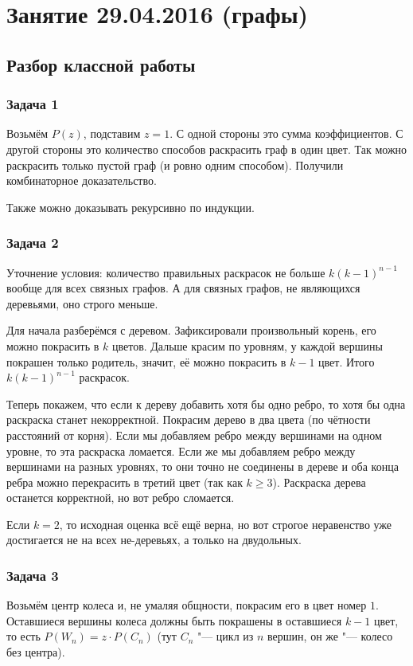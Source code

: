 \chapter{Занятие 29.04.2016 (графы)}

\section{Разбор классной работы}
\subsection{Задача 1}
	Возьмём $P(z)$, подставим $z=1$.
	С одной стороны это сумма коэффициентов.
	С другой стороны это количество способов раскрасить граф в один цвет.
	Так можно раскрасить только пустой граф (и ровно одним способом).
	Получили комбинаторное доказательство.

	Также можно доказывать рекурсивно по индукции.

\subsection{Задача 2}
	Уточнение условия:
	количество правильных раскрасок не больше $k(k-1)^{n-1}$ вообще для всех связных графов.
	А для связных графов, не являющихся деревьями, оно строго меньше.

	Для начала разберёмся с деревом.
	Зафиксировали произвольный корень, его можно покрасить в $k$ цветов.
	Дальше красим по уровням, у каждой вершины покрашен только родитель, значит,
	её можно покрасить в $k-1$ цвет.
	Итого $k(k-1)^{n-1}$ раскрасок.

	Теперь покажем, что если к дереву добавить хотя бы одно ребро, то хотя бы одна раскраска станет некорректной.
	Покрасим дерево в два цвета (по чётности расстояний от корня).
	Если мы добавляем ребро между вершинами на одном уровне, то эта раскраска ломается.
	Если же мы добавляем ребро между вершинами на разных уровнях, то они точно не соединены в дереве
	и оба конца ребра можно перекрасить в третий цвет (так как $k \ge 3$).
	Раскраска дерева останется корректной, но вот ребро сломается.
	\begin{Rem}
		Если $k=2$, то исходная оценка всё ещё верна, но вот строгое неравенство уже достигается не на всех не-деревьях, а только на двудольных.
	\end{Rem}

\subsection{Задача 3}
	Возьмём центр колеса и, не умаляя общности, покрасим его в цвет номер $1$.
	Оставшиеся вершины колеса должны быть покрашены в оставшиеся $k-1$ цвет,
	то есть $P(W_n) = z\cdot P(C_n)$ (тут $C_n$ "--- цикл из $n$ вершин, он же "--- колесо без центра).

